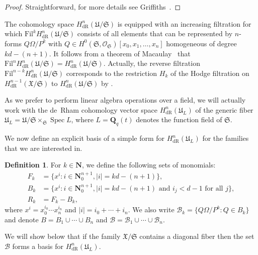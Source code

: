\documentclass[a4paper,11pt]{article}
\numberwithin{equation}{section}
\providecommand{\abs}[1]{\lvert#1\rvert}                 %
\newcommand{\NN}{\mathbf{N}} %
\newcommand{\QQ}{\mathbf{Q}} %
\DeclareMathOperator{\Spec}{Spec}        %
\providecommand{\HdR}{H_{\text{dR}}}    %
\providecommand{\cB}{\mathcal{B}} %
\theoremstyle{definition}
\newtheorem{defn}[thm]{Definition}
\begin{document}
\begin{proof}
Straightforward, for more details see Griffiths~\citep[\S 4]{Griffiths1969}.
\end{proof}

The cohomology space $\HdR^{n}(\mathfrak{U}/\mathfrak{S})$ is equipped with 
an increasing filtration for which $\mbox{Fil}^k \HdR^{n}(\mathfrak{U}/\mathfrak{S})$ consists of 
all elements that can be represented by $n$-forms $Q \Omega / P^k$ 
with $Q \in H^0(\mathfrak{S},\mathcal{O}_{\mathfrak{S}})[x_0, x_1, \dotsc, x_n]$ homogeneous of degree $kd - (n + 1)$. 
It follows from a theorem of Macaulay~\citep[\S 4, (4.11)]{Griffiths1969} 
that $\mbox{Fil}^n \HdR^{n}(\mathfrak{U}/\mathfrak{S})= \HdR^{n}(\mathfrak{U}/\mathfrak{S})$. 
Actually, the reverse filtration $\mbox{Fil}^{n-k} \HdR^{n}(\mathfrak{U}/\mathfrak{S})$
corresponds to the restriction $H_k$ of the Hodge filtration on $\HdR^{n-1}(\mathfrak{X}/\mathfrak{S})$ 
to $\HdR^{n}(\mathfrak{U}/\mathfrak{S})$ by \cite{Griffiths1969}.

As we prefer to perform linear 
algebra operations over a field, we will actually work with the de~Rham 
cohomology vector space $\HdR^{n}(\mathfrak{U}_L)$ of the generic fiber 
$\mathfrak{U}_L = \mathfrak{U}/\mathfrak{S} \times_{\mathfrak{S}} \Spec{L}$, 
where $L=\QQ_q(t)$ denotes the function field of $\mathfrak{S}$. 

We now define an explicit 
basis of a simple form for $\HdR^{n}(\mathfrak{U}_L)$ for the families 
that we are interested in.

\begin{defn} \label{defn:MonBasis}
For $k \in \NN$, we define the following sets of monomials: 
\begin{align*}
F_k & = \{ x^i : i \in \mathbf{N}_{0}^{n+1}, \abs{i} = k d - (n+1) \}, \\
B_k & = \{ x^i : i \in \mathbf{N}_{0}^{n+1}, \abs{i} = k d - (n+1) \text{ and $i_j < d-1$ for all $j$}\}, \\
R_k & = F_k - B_k,
\end{align*}
where $x^i = x_0^{i_0} \dotsm x_n^{i_n}$ and $\abs{i} = i_0 + \dotsb + i_n$. 
We also write $\cB_k = \{Q \Omega / P^k : Q \in B_k\}$ and denote
$B = B_1 \cup \dotsb \cup B_n$ and $\cB = \cB_1 \cup \dotsb \cup \cB_n$.
\end{defn}

We will show below that if the family $\mathfrak{X}/{\mathfrak{S}}$ contains 
a diagonal fiber then the set $\cB$ forms a basis for $\HdR^n(\mathfrak{U}_L)$.
\end{document}
